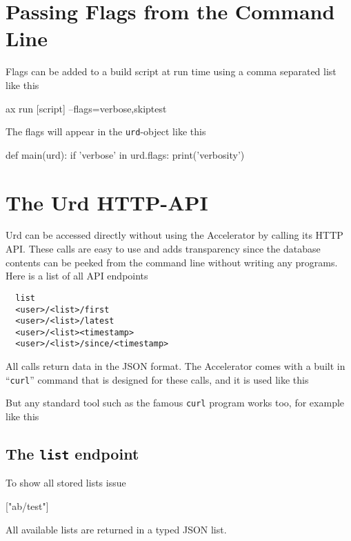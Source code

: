 \section{Passing Flags from the Command Line}
Flags can be added to a build script at run time using a comma
separated list like this
\begin{python}
ax run [script] --flags=verbose,skiptest
\end{python}
The flags will appear in the \texttt{urd}-object like this
\begin{python}
def main(urd):
    if 'verbose' in urd.flags:
       print('verbosity')
\end{python}





\section{The Urd HTTP-API}
\label{sec:urd-api}
Urd can be accessed directly without using the Accelerator by calling
its HTTP API.  These calls are easy to use and adds transparency since
the database contents can be peeked from the command line without
writing any programs.  Here is a list of all API endpoints
\begin{verbatim}
  list
  <user>/<list>/first
  <user>/<list>/latest
  <user>/<list><timestamp>
  <user>/<list>/since/<timestamp>
\end{verbatim}
All calls return data in the JSON format.  The Accelerator comes with
a built in ``\texttt{curl}'' command that is designed for these calls,
and it is used like this
\begin{shell}
\end{shell}
But any standard tool such as the famous \texttt{curl} program works
too, for example like this
\begin{shell}
\end{shell}



\subsection{The \texttt{list} endpoint}
To show all stored lists issue
\begin{shell}
["ab/test"]
\end{shell}
All available lists are returned in a typed JSON list.



